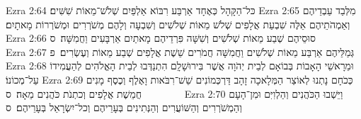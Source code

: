 Ezra 2:64	כּל־הַקָּהָל כְּאֶחָד אַרְבַּע רִבּוֹא אַלְפַּיִם שְׁלֹשׁ־מֵאוֹת שִׁשִּׁים׃
Ezra 2:65	מִלְּבַד עַבְדֵיהֶם וְאַמְהֹתֵיהֶם אֵלֶּה שִׁבְעַת אֲלָפִים שְׁלֹשׁ מֵאוֹת שְׁלֹשִׁים וְשִׁבְעָה וְלָהֶם מְשֹׁרְרִים וּמְשֹׁרְרוֹת מָאתָיִם׃
Ezra 2:66	סוּסֵיהֶם שְׁבַע מֵאוֹת שְׁלֹשִׁים וְשִׁשָּׁה פִּרְדֵיהֶם מָאתַיִם אַרְבָּעִים וַחֲמִשָּׁה׃ {ס}        
Ezra 2:67	גְּמַלֵּיהֶם אַרְבַּע מֵאוֹת שְׁלֹשִׁים וַחֲמִשָּׁה חֲמֹרִים שֵׁשֶׁת אֲלָפִים שְׁבַע מֵאוֹת וְעֶשְׂרִים׃ {פ}
Ezra 2:68	וּמֵרָאשֵׁי הָאָבוֹת בְּבוֹאָם לְבֵית יְהֹוָה אֲשֶׁר בִּירוּשָׁלָ͏ִם הִתְנַדְּבוּ לְבֵית הָאֱלֹהִים לְהַעֲמִידוֹ עַל־מְכוֹנוֹ׃
Ezra 2:69	כְּכֹחָם נָתְנוּ לְאוֹצַר הַמְּלָאכָה זָהָב דַּרְכְּמוֹנִים שֵׁשׁ־רִבֹּאות וָאֶלֶף וְכֶסֶף מָנִים חֲמֵשֶׁת אֲלָפִים וְכתְנֹת כֹּהֲנִים מֵאָה׃ {ס}        
Ezra 2:70	וַיֵּשְׁבוּ הַכֹּהֲנִים וְהַלְוִיִּם וּמִן־הָעָם וְהַמְשֹׁרְרִים וְהַשּׁוֹעֲרִים וְהַנְּתִינִים בְּעָרֵיהֶם וְכל־יִשְׂרָאֵל בְּעָרֵיהֶם׃ {ס}        
